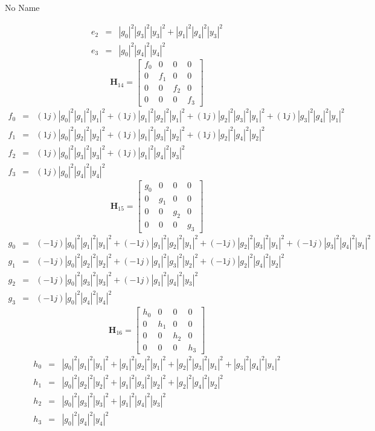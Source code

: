 \documentclass[a4paper,10pt]{article}
\begin{document}
\begin{section}{No Name}
\begin{landscape}
\begin{eqnarray}
e_{2} &=& |g_0|^2|g_3|^2|y_3|^2 + |g_1|^2|g_4|^2|y_3|^2\\
e_{3} &=& |g_0|^2|g_4|^2|y_4|^2
\end{eqnarray}
\begin{equation}
\boldsymbol{H}_{14} = 
\begin{bmatrix}
f_{0}&0&0&0\\
0&f_{1}&0&0\\
0&0&f_{2}&0\\
0&0&0&f_{3}
\end{bmatrix}
\end{equation}
\begin{eqnarray}
f_{0} &=& (1j)|g_0|^2|g_1|^2|y_1|^2 + (1j)|g_1|^2|g_2|^2|y_1|^2 + (1j)|g_2|^2|g_3|^2|y_1|^2 + (1j)|g_3|^2|g_4|^2|y_1|^2\\
f_{1} &=& (1j)|g_0|^2|g_2|^2|y_2|^2 + (1j)|g_1|^2|g_3|^2|y_2|^2 + (1j)|g_2|^2|g_4|^2|y_2|^2\\
f_{2} &=& (1j)|g_0|^2|g_3|^2|y_3|^2 + (1j)|g_1|^2|g_4|^2|y_3|^2\\
f_{3} &=& (1j)|g_0|^2|g_4|^2|y_4|^2
\end{eqnarray}
\begin{equation}
\boldsymbol{H}_{15} = 
\begin{bmatrix}
g_{0}&0&0&0\\
0&g_{1}&0&0\\
0&0&g_{2}&0\\
0&0&0&g_{3}
\end{bmatrix}
\end{equation}
\begin{eqnarray}
g_{0} &=& (-1j)|g_0|^2|g_1|^2|y_1|^2 + (-1j)|g_1|^2|g_2|^2|y_1|^2 + (-1j)|g_2|^2|g_3|^2|y_1|^2 + (-1j)|g_3|^2|g_4|^2|y_1|^2\\
g_{1} &=& (-1j)|g_0|^2|g_2|^2|y_2|^2 + (-1j)|g_1|^2|g_3|^2|y_2|^2 + (-1j)|g_2|^2|g_4|^2|y_2|^2\\
g_{2} &=& (-1j)|g_0|^2|g_3|^2|y_3|^2 + (-1j)|g_1|^2|g_4|^2|y_3|^2\\
g_{3} &=& (-1j)|g_0|^2|g_4|^2|y_4|^2
\end{eqnarray}
\begin{equation}
\boldsymbol{H}_{16} = 
\begin{bmatrix}
h_{0}&0&0&0\\
0&h_{1}&0&0\\
0&0&h_{2}&0\\
0&0&0&h_{3}
\end{bmatrix}
\end{equation}
\begin{eqnarray}
h_{0} &=& |g_0|^2|g_1|^2|y_1|^2 + |g_1|^2|g_2|^2|y_1|^2 + |g_2|^2|g_3|^2|y_1|^2 + |g_3|^2|g_4|^2|y_1|^2\\
h_{1} &=& |g_0|^2|g_2|^2|y_2|^2 + |g_1|^2|g_3|^2|y_2|^2 + |g_2|^2|g_4|^2|y_2|^2\\
h_{2} &=& |g_0|^2|g_3|^2|y_3|^2 + |g_1|^2|g_4|^2|y_3|^2\\
h_{3} &=& |g_0|^2|g_4|^2|y_4|^2
\end{eqnarray}
\end{landscape}



\end{section}
\end{document}
